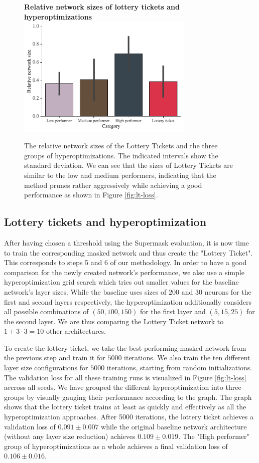 \documentclass[12pt,final,twoside]{article}
\theoremstyle{plain}
\theoremstyle{definition}
\theoremstyle{remark}
\theoremstyle{named}
\begin{document}
\begin{figure}[t]
  \centering
  \textbf{Relative network sizes of lottery tickets and hyperoptimizations}
  \includegraphics[width=0.75\textwidth]{plots/lt-size.pdf}
  \caption{The relative network sizes of the Lottery Tickets and the three groups of hyperoptimizations. The indicated intervals show the standard deviation. We can see that the sizes of Lottery Tickets are similar to the low and medium performers, indicating that the method prunes rather aggressively while achieving a good performance as shown in Figure \ref{fig:lt-loss}.}
  \label{fig:lt-size}
\end{figure}

\subsection{Lottery tickets and hyperoptimization}
After having chosen a threshold using the Supermask evaluation, it is now time to train the corresponding masked network and thus create the "Lottery Ticket". This corresponds to steps 5 and 6 of our methodology. In order to have a good comparison for the newly created network's performance, we also use a simple hyperoptimization grid search which tries out smaller values for the baseline network's layer sizes. While the baseline uses sizes of $200$ and $30$ neurons for the first and second layers respectively, the hyperoptimization additionally considers all possible combinations of $(50, 100, 150)$ for the first layer and $(5, 15, 25)$ for the second layer. We are thus comparing the Lottery Ticket network to $1 + 3 \cdot 3 = 10$ other architectures.

To create the lottery ticket, we take the best-performing masked network from the previous step and train it for $5000$ iterations. We also train the ten different layer size configurations for $5000$ iterations, starting from random initializations. The validation loss for all these training runs is visualized in Figure \ref{fig:lt-loss} accross all seeds. We have grouped the different hyperoptimization into three groups by visually gauging their performance according to the graph. The graph shows that the lottery ticket trains at least as quickly and effectively as all the hyperoptimization approaches. After 5000 iterations, the lottery ticket achieves a validation loss of $0.091 \pm 0.007$ while the original baseline network architecture (without any layer size reduction) achieves $0.109 \pm 0.019$. The "High performer" group of hyperoptimizations as a whole achieves a final validation loss of $0.106 \pm 0.016$.
\end{document}
